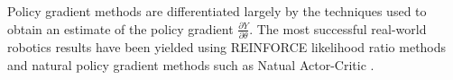 Policy gradient methods are differentiated largely by the techniques used to
obtain an estimate of the policy gradient $\frac{\partial Y}{\partial \theta}$.
The most successful real-world robotics results have been yielded using
REINFORCE likelihood ratio methods \cite{williams:reinforce} and natural policy
gradient methods such as Natual Actor-Critic \cite{peters:enac}.

%
%
%


